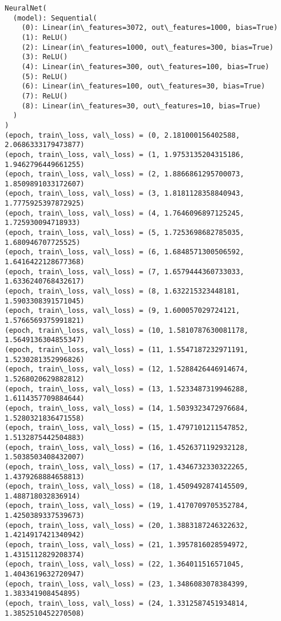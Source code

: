 \documentclass[11pt]{article}
\begin{document}
    \begin{Verbatim}[commandchars=\\\{\}]
NeuralNet(
  (model): Sequential(
    (0): Linear(in\_features=3072, out\_features=1000, bias=True)
    (1): ReLU()
    (2): Linear(in\_features=1000, out\_features=300, bias=True)
    (3): ReLU()
    (4): Linear(in\_features=300, out\_features=100, bias=True)
    (5): ReLU()
    (6): Linear(in\_features=100, out\_features=30, bias=True)
    (7): ReLU()
    (8): Linear(in\_features=30, out\_features=10, bias=True)
  )
)
(epoch, train\_loss, val\_loss) = (0, 2.181000156402588, 2.0686333179473877)
(epoch, train\_loss, val\_loss) = (1, 1.9753135204315186, 1.9462796449661255)
(epoch, train\_loss, val\_loss) = (2, 1.8866861295700073, 1.8509891033172607)
(epoch, train\_loss, val\_loss) = (3, 1.8181128358840943, 1.7775925397872925)
(epoch, train\_loss, val\_loss) = (4, 1.7646096897125245, 1.725930094718933)
(epoch, train\_loss, val\_loss) = (5, 1.7253698682785035, 1.680946707725525)
(epoch, train\_loss, val\_loss) = (6, 1.6848571300506592, 1.6416422128677368)
(epoch, train\_loss, val\_loss) = (7, 1.6579444360733033, 1.6336240768432617)
(epoch, train\_loss, val\_loss) = (8, 1.632215323448181, 1.5903308391571045)
(epoch, train\_loss, val\_loss) = (9, 1.600057029724121, 1.5766569375991821)
(epoch, train\_loss, val\_loss) = (10, 1.5810787630081178, 1.5649136304855347)
(epoch, train\_loss, val\_loss) = (11, 1.5547187232971191, 1.5230281352996826)
(epoch, train\_loss, val\_loss) = (12, 1.5288426446914674, 1.5268020629882812)
(epoch, train\_loss, val\_loss) = (13, 1.5233487319946288, 1.6114357709884644)
(epoch, train\_loss, val\_loss) = (14, 1.5039323472976684, 1.5280321836471558)
(epoch, train\_loss, val\_loss) = (15, 1.4797101211547852, 1.5132875442504883)
(epoch, train\_loss, val\_loss) = (16, 1.4526371192932128, 1.5038503408432007)
(epoch, train\_loss, val\_loss) = (17, 1.4346732330322265, 1.4379268884658813)
(epoch, train\_loss, val\_loss) = (18, 1.4509492874145509, 1.488718032836914)
(epoch, train\_loss, val\_loss) = (19, 1.4170709705352784, 1.4250389337539673)
(epoch, train\_loss, val\_loss) = (20, 1.3883187246322632, 1.4214917421340942)
(epoch, train\_loss, val\_loss) = (21, 1.3957816028594972, 1.4315112829208374)
(epoch, train\_loss, val\_loss) = (22, 1.364011516571045, 1.4043619632720947)
(epoch, train\_loss, val\_loss) = (23, 1.3486083078384399, 1.383341908454895)
(epoch, train\_loss, val\_loss) = (24, 1.3312587451934814, 1.3852510452270508)

    \end{Verbatim}
\end{document}
